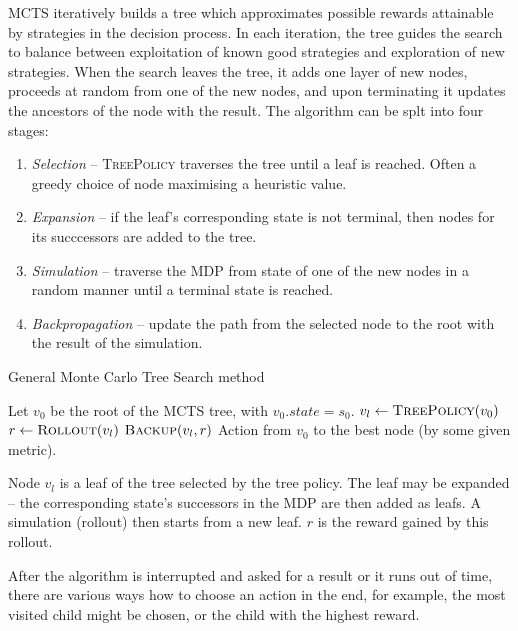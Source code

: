 MCTS iteratively builds a tree which approximates possible rewards
attainable by strategies in the decision process. In each iteration, the
tree guides the search to balance between exploitation of known good
strategies and exploration of new strategies. When the search leaves the
tree, it adds one layer of new nodes, proceeds at random from one of the
new nodes, and upon terminating it updates the ancestors of the node
with the result. The algorithm can be splt into four stages:

\begin{enumerate}
    \item {\em Selection} -- \textsc{TreePolicy} traverses the tree
        until a leaf is reached. Often a greedy choice of node
        maximising a heuristic value.
    \item {\em Expansion} -- if the leaf's corresponding state is not
        terminal, then nodes for its succcessors are added to the tree.
    \item {\em Simulation} -- traverse the MDP from state of one of the new
        nodes in a random manner until a terminal state is reached.
    \item {\em Backpropagation} -- update the path from the selected
        node to the root with the result of the simulation.
\end{enumerate}


\begin{algorithm}
\caption{General Monte Carlo Tree Search method}
\label{mcts}
\begin{algorithmic}[1]
    \State Let $v_0$ be the root of the MCTS tree, with $v_0.state = s_0$.
        \State $v_l \gets \Call{TreePolicy}{v_0}$
        \State $r \gets \Call{Rollout}{v_l}$
        \State $\Call{Backup}{v_l, r}$
    \EndWhile
    \State \Return Action from $v_0$ to the best node (by some
    given metric).
\EndFunction
\end{algorithmic}
\end{algorithm}

Node $v_l$ is a leaf of the tree selected by the tree policy.
The leaf may be expanded -- the corresponding state's successors in the
MDP are then added as leafs.
A simulation (rollout) then starts from a new leaf.
$r$ is the reward gained by this rollout.

After the algorithm is interrupted and asked for a result or it runs out
of time, there are various ways how to
choose an action in the end, for example, the most visited child might
be chosen, or the child with the highest reward.


